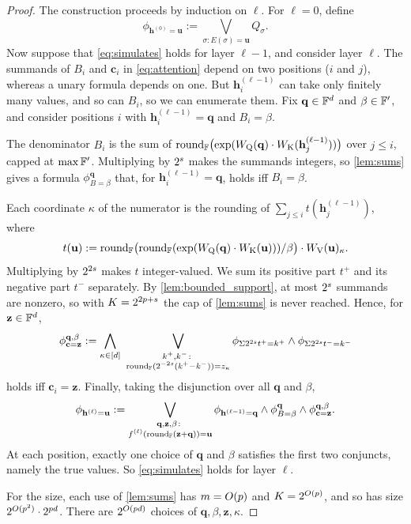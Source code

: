 \begin{proof}
The construction proceeds by induction on $\ell$. For $\ell=0$, define
\[
\phi_{\mathbf{h}^{(0)}=\mathbf{u}} := \bigvee_{\sigma\colon E(\sigma)=\mathbf{u}}Q_\sigma.
\]
Now suppose that \cref{eq:simulates} holds for layer $\ell-1$, and consider layer $\ell$.
The summands of $B_i$ and $\mathbf{c}_i$ in \cref{eq:attention} depend on two positions ($i$ and $j$),
whereas a unary formula depends on one. But $\mathbf{h}^{(\ell-1)}_i$ can take only finitely many values,
and so can $B_i$, so we can enumerate them. Fix $\mathbf{q}\in\mathbb{F}^d$ and $\beta\in\mathbb{F}'$, and consider
positions $i$ with $\mathbf{h}^{(\ell-1)}_i=\mathbf{q}$ and $B_i=\beta$.

The denominator $B_i$ is the sum of $\textnormal{round}_{\mathbb{F}}\bigl(\exp(W_{\textnormal{Q}}(\mathbf{q})\cdot W_{\textnormal{K}}(\mathbf{h}^{(\ell-1)}_j))\bigr)$
over $j\leq i$, capped at $\max\mathbb{F}'$.
Multiplying by $2^{{s}}$ makes the summands integers, so \cref{lem:sums} gives a formula
$\phi^{\mathbf{q}}_{B=\beta}$ that, for $\mathbf{h}^{(\ell-1)}_i=\mathbf{q}$, holds iff $B_i=\beta$.

Each coordinate $\kappa$ of the numerator is the rounding of
$\sum_{j\leq i}t(\mathbf{h}^{(\ell-1)}_j)$, where
\[
t(\mathbf{u}) := \textnormal{round}_{\mathbb{F}}\bigl(\textnormal{round}_{\mathbb{F}}(\exp(W_{\textnormal{Q}}(\mathbf{q})\cdot W_{\textnormal{K}}(\mathbf{u})))/\beta\bigr)\cdot W_{\textnormal{V}}(\mathbf{u})_\kappa .
\]
Multiplying by $2^{2{s}}$ makes $t$ integer-valued. We sum its positive part $t^+$ and its negative part $t^-$ separately.
By \cref{lem:bounded_support}, at most $2^{{s}}$ summands are nonzero, so with
$K=2^{2{p}+{s}}$ the cap of \cref{lem:sums} is never reached. Hence, for $\mathbf{z}\in\mathbb{F}^d$,
\[
\phi^{\mathbf{q},\beta}_{\mathbf{c}=\mathbf{z}} := \bigwedge_{\kappa\in[d]}\ \bigvee_{\substack{k^+,k^-\colon\\ \textnormal{round}_{\mathbb{F}}(2^{-2{s}}(k^+-k^-))=z_\kappa}}
\phi_{\Sigma 2^{2{s}}t^+=k^+}\land\phi_{\Sigma 2^{2{s}}t^-=k^-}
\]
holds iff $\mathbf{c}_i=\mathbf{z}$.
Finally, taking the disjunction over all $\mathbf{q}$ and $\beta$,
\[
\phi_{\mathbf{h}^{(\ell)}=\mathbf{u}} := \bigvee_{\substack{\mathbf{q},\mathbf{z},\beta\colon\\ f^{(\ell)}(\textnormal{round}_{\mathbb{F}}(\mathbf{z}+\mathbf{q}))=\mathbf{u}}}
\phi_{\mathbf{h}^{(\ell-1)}=\mathbf{q}}\land\phi^{\mathbf{q}}_{B=\beta}\land\phi^{\mathbf{q},\beta}_{\mathbf{c}=\mathbf{z}}.
\]
At each position, exactly one choice of $\mathbf{q}$ and $\beta$ satisfies the first two conjuncts, namely the true values.
So \cref{eq:simulates} holds for layer $\ell$.

For the size, each use of \cref{lem:sums} has $m=O({p})$ and $K=2^{O({p})}$, and so has size
$2^{O({p}^2)}\cdot2^{{p} d}$. There are $2^{O({p} d)}$ choices of $\mathbf{q},\beta,\mathbf{z},\kappa$.
\end{proof}

